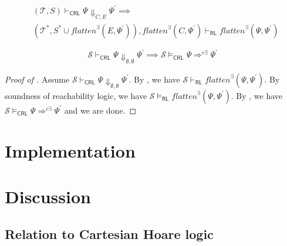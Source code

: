 \documentclass{article}
\newcommand{\RL}{\mathsf{RL}}
\newcommand{\CRL}{\mathsf{CRL}}
\begin{document}
\begin{lemma}\label{lem:CRLalmostSoundness}
    \begin{align*}
        & (\mathcal{T}, S) \vdash_\CRL \Psi \Downarrow_{C,E} \Psi^\prime \implies \\
        &
        (\mathcal{T}^*, S^* \cup \mathit{flatten}^\exists(E, \Psi^\prime)), \mathit{flatten}^\exists(C, \Psi^\prime) \vdash_\RL
          \mathit{flatten}^\exists(\Psi, \Psi^\prime) 
    \end{align*}
\end{lemma}

\begin{theorem}\label{thm:proofsystemSoundness}
\begin{equation*}
    \mathcal{S} \vdash_\CRL \Psi \Downarrow_{\emptyset,\emptyset} \Psi^\prime \implies
    \mathcal{S} \vDash_{\CRL} \Psi \Rightarrow^{c\exists} \Psi^\prime
\end{equation*}
\end{theorem}
\begin{proof}[Proof of ]
Assume $\mathcal{S} \vdash_\CRL \Psi \Downarrow_{\emptyset,\emptyset} \Psi^\prime$.
By , we have $\mathcal{S} \vdash_\RL \mathit{flatten}^\exists(\Psi, \Psi^\prime)$.
By soundness of reachability logic, we have $\mathcal{S} \vDash_\RL \mathit{flatten}^\exists(\Psi, \Psi^\prime)$.
By , 
we have $\mathcal{S} \vDash_{\CRL} \Psi \Rightarrow^{c\exists} \Psi^\prime$ and we are done.
\end{proof}

\section{Implementation}

\section{Discussion}\label{sec:discussion}

\subsection{Relation to Cartesian Hoare logic}
\end{document}
